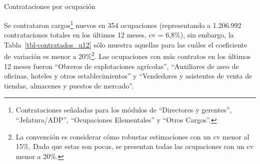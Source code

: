 \documentclass[
  11pt,
]{article}
\makeatletter
\let\oldsubparagraph\subparagraph
\renewcommand{\subparagraph}{
    \@ifstar
      \xxxSubParagraphStar
      \xxxSubParagraphNoStar
  }
\newcommand{\xxxSubParagraphStar}[1]{\oldsubparagraph*{#1}\mbox{}}
\newcommand{\xxxSubParagraphNoStar}[1]{\oldsubparagraph{#1}\mbox{}}
\makeatother
\begin{document}
\FloatBarrier

\begin{table}

\caption{\label{tbl-contratos_totales}Porcentaje de empresas que
contrataron en los últimos 12 meses por sector económico}


\end{table}%

\FloatBarrier

\subparagraph{Contrataciones por
ocupación}\label{contrataciones-por-ocupaciuxf3n}

Se contrataron cargos\footnote{Contrataciones señaladas para los módulos
  de ``Directores y gerentes'', ``Jefatura/ADP'', ``Ocupaciones
  Elementales'' y ``Otros Cargos''.} nuevos en 354 ocupaciones
(representando a 1.206.992 contrataciones totales en los últimos 12
meses, cv = 6,8\%), sin embargo, la Tabla~\ref{tbl-contratados_u12} sólo
muestra aquellas para las cuáles el coeficiente de variación es menor a
20\%\footnote{La convención es considerar cómo robustas estimaciones con
  un cv menor al 15\%. Dado que estas son pocas, se presentan todas las
  ocupaciones con un cv menor a 20\%.}. Las ocupaciones con más
contratos en los últimos 12 meses fueron ``Obreros de explotaciones
agrícolas'', ``Auxiliares de aseo de oficinas, hoteles y otros
establecimientos'' y ``Vendedores y asistentes de venta de tiendas,
almacenes y puestos de mercado''.
\end{document}
